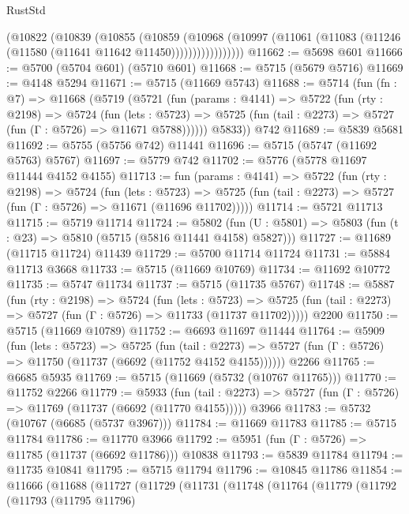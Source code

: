 \begin{lexlean}{RustStd}
\begin{coremodule}
                (@10822
                  (@10839
                    (@10855
                      (@10859
                        (@10968
                          (@10997
                            (@11061 (@11083 (@11246 (@11580 (@11641 @11642 @11450)))))))))))))))))
@11662 := @5698 @601
@11666 := @5700 (@5704 @601) (@5710 @601)
@11668 := @5715 (@5679 @5716)
@11669 := @4148 @5294
@11671 := @5715 (@11669 @5743)
@11688 := @5714
    (fun (fn : @7) =>
    @11668
      (@5719
        (@5721
          (fun (params : @4141) =>
          @5722
            (fun (rty : @2198) =>
            @5724
              (fun (lets : @5723) =>
              @5725 (fun (tail : @2273) => @5727 (fun (Γ : @5726) => @11671 @5788))))))
        @5833))
    @742
@11689 := @5839 @5681
@11692 := @5755 (@5756 @742) @11441
@11696 := @5715 (@5747 (@11692 @5763) @5767)
@11697 := @5779 @742
@11702 := @5776 (@5778 @11697 @11444 @4152 @4155)
@11713 := fun (params : @4141) =>
  @5722
    (fun (rty : @2198) =>
    @5724
      (fun (lets : @5723) =>
      @5725 (fun (tail : @2273) => @5727 (fun (Γ : @5726) => @11671 (@11696 @11702)))))
@11714 := @5721 @11713
@11715 := @5719 @11714
@11724 := @5802
    (fun (U : @5801) => @5803 (fun (t : @23) => @5810 (@5715 (@5816 @11441 @4158) @5827)))
@11727 := @11689 (@11715 @11724) @11439
@11729 := @5700 @11714 @11724
@11731 := @5884 @11713 @3668
@11733 := @5715 (@11669 @10769)
@11734 := @11692 @10772
@11735 := @5747 @11734
@11737 := @5715 (@11735 @5767)
@11748 := @5887
    (fun (rty : @2198) =>
    @5724
      (fun (lets : @5723) =>
      @5725 (fun (tail : @2273) => @5727 (fun (Γ : @5726) => @11733 (@11737 @11702)))))
    @2200
@11750 := @5715 (@11669 @10789)
@11752 := @6693 @11697 @11444
@11764 := @5909
    (fun (lets : @5723) =>
    @5725
      (fun (tail : @2273) =>
      @5727 (fun (Γ : @5726) => @11750 (@11737 (@6692 (@11752 @4152 @4155))))))
    @2266
@11765 := @6685 @5935
@11769 := @5715 (@11669 (@5732 (@10767 @11765)))
@11770 := @11752 @2266
@11779 := @5933
    (fun (tail : @2273) => @5727 (fun (Γ : @5726) => @11769 (@11737 (@6692 (@11770 @4155)))))
    @3966
@11783 := @5732 (@10767 (@6685 (@5737 @3967)))
@11784 := @11669 @11783
@11785 := @5715 @11784
@11786 := @11770 @3966
@11792 := @5951 (fun (Γ : @5726) => @11785 (@11737 (@6692 @11786))) @10838
@11793 := @5839 @11784
@11794 := @11735 @10841
@11795 := @5715 @11794
@11796 := @10845 @11786
@11854 := @11666
    (@11688
      (@11727
        (@11729
          (@11731
            (@11748
              (@11764
                (@11779
                  (@11792
                    (@11793
                      (@11795 @11796)

\end{coremodule}
\end{lexlean}
